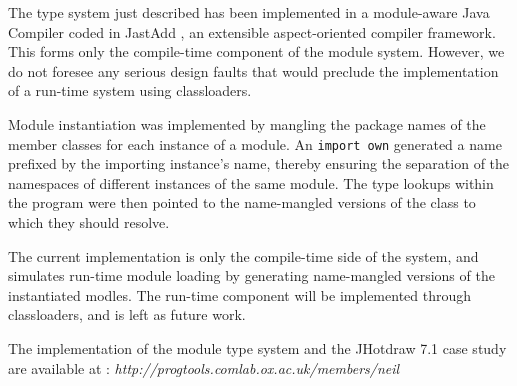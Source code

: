 The type system just described has been implemented in a
module-aware Java Compiler coded in JastAdd \cite{jastadd},
an extensible aspect-oriented compiler framework. This forms
only the compile-time component of the module system. However,
we do not foresee any serious design faults that would preclude
the implementation of a run-time system using classloaders.

Module instantiation was implemented by mangling
the package names of the member classes for each instance of 
a module. An \texttt{import own} generated a name prefixed by 
the importing instance's name, thereby ensuring the separation
of the namespaces of different instances of the same module.
The type lookups within the program were then pointed to the
name-mangled versions of the class to which they should resolve.

The current implementation is only the compile-time side of
the system, and simulates run-time module loading by generating 
name-mangled versions of the instantiated modles. 
The run-time component will be implemented through
classloaders, and is left as future work.

The implementation of the module type system and the 
JHotdraw 7.1 case study are available at : 
\textit{http://progtools.comlab.ox.ac.uk/members/neil}










